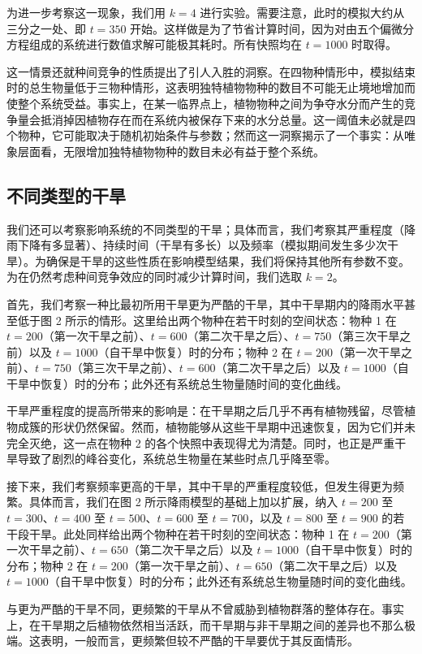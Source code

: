 \documentclass[11pt,a4paper]{ctexart}
\begin{document}
为进一步考察这一现象，我们用 $k=4$ 进行实验。需要注意，此时的模拟大约从三分之一处、即 $t=350$ 开始。这样做是为了节省计算时间，因为对由五个偏微分方程组成的系统进行数值求解可能极其耗时。所有快照均在 $t=1000$ 时取得。

这一情景还就种间竞争的性质提出了引人入胜的洞察。在四物种情形中，模拟结束时的总生物量低于三物种情形，这表明独特植物物种的数目不可能无止境地增加而使整个系统受益。事实上，在某一临界点上，植物物种之间为争夺水分而产生的竞争量会抵消掉因植物存在而在系统内被保存下来的水分总量。这一阈值未必就是四个物种，它可能取决于随机初始条件与参数；然而这一洞察揭示了一个事实：从唯象层面看，无限增加独特植物物种的数目未必有益于整个系统。

\subsection{不同类型的干旱}

我们还可以考察影响系统的不同类型的干旱；具体而言，我们考察其严重程度（降雨下降有多显著）、持续时间（干旱有多长）以及频率（模拟期间发生多少次干旱）。为确保是干旱的这些性质在影响模型结果，我们将保持其他所有参数不变。为在仍然考虑种间竞争效应的同时减少计算时间，我们选取 $k=2$。

首先，我们考察一种比最初所用干旱更为严酷的干旱，其中干旱期内的降雨水平甚至低于图 2 所示的情形。这里给出两个物种在若干时刻的空间状态：物种 1 在 $t=200$（第一次干旱之前）、$t=600$（第二次干旱之后）、$t=750$（第三次干旱之前）以及 $t=1000$（自干旱中恢复）时的分布；物种 2 在 $t=200$（第一次干旱之前）、$t=750$（第三次干旱之前）、$t=600$（第二次干旱之后）以及 $t=1000$（自干旱中恢复）时的分布；此外还有系统总生物量随时间的变化曲线。

干旱严重程度的提高所带来的影响是：在干旱期之后几乎不再有植物残留，尽管植物成簇的形状仍然保留。然而，植物能够从这些干旱期中迅速恢复，因为它们并未完全灭绝，这一点在物种 2 的各个快照中表现得尤为清楚。同时，也正是严重干旱导致了剧烈的峰谷变化，系统总生物量在某些时点几乎降至零。

接下来，我们考察频率更高的干旱，其中干旱的严重程度较低，但发生得更为频繁。具体而言，我们在图 2 所示降雨模型的基础上加以扩展，纳入 $t=200$ 至 $t=300$、$t=400$ 至 $t=500$、$t=600$ 至 $t=700$，以及 $t=800$ 至 $t=900$ 的若干段干旱。此处同样给出两个物种在若干时刻的空间状态：物种 1 在 $t=200$（第一次干旱之前）、$t=650$（第二次干旱之后）以及 $t=1000$（自干旱中恢复）时的分布；物种 2 在 $t=200$（第一次干旱之前）、$t=650$（第二次干旱之后）以及 $t=1000$（自干旱中恢复）时的分布；此外还有系统总生物量随时间的变化曲线。

与更为严酷的干旱不同，更频繁的干旱从不曾威胁到植物群落的整体存在。事实上，在干旱期之后植物依然相当活跃，而干旱期与非干旱期之间的差异也不那么极端。这表明，一般而言，更频繁但较不严酷的干旱要优于其反面情形。
\end{document}
